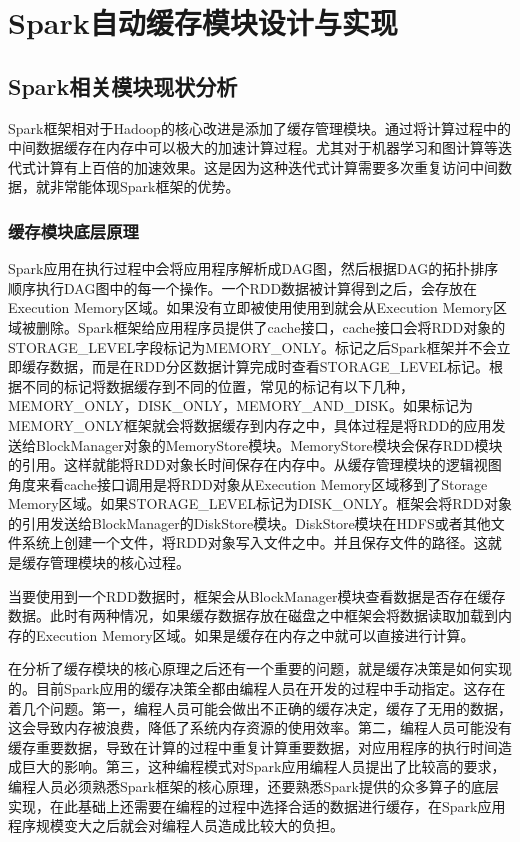 \chapter{Spark自动缓存模块设计与实现}\label{chap:auto-cache}

\section{Spark相关模块现状分析}
Spark框架相对于Hadoop的核心改进是添加了缓存管理模块。通过将计算过程中的中间数据缓存在内存中可以极大的加速计算过程。尤其对于机器学习和图计算等迭代式计算有上百倍的加速效果。这是因为这种迭代式计算需要多次重复访问中间数据，就非常能体现Spark框架的优势。

\subsection{缓存模块底层原理}
Spark应用在执行过程中会将应用程序解析成DAG图，然后根据DAG的拓扑排序顺序执行DAG图中的每一个操作。一个RDD数据被计算得到之后，会存放在Execution Memory区域。如果没有立即被使用使用到就会从Execution Memory区域被删除。Spark框架给应用程序员提供了cache接口，cache接口会将RDD对象的STORAGE\_LEVEL字段标记为MEMORY\_ONLY。标记之后Spark框架并不会立即缓存数据，而是在RDD分区数据计算完成时查看STORAGE\_LEVEL标记。根据不同的标记将数据缓存到不同的位置，常见的标记有以下几种，MEMORY\_ONLY，DISK\_ONLY，MEMORY\_AND\_DISK。如果标记为MEMORY\_ONLY框架就会将数据缓存到内存之中，具体过程是将RDD的应用发送给BlockManager对象的MemoryStore模块。MemoryStore模块会保存RDD模块的引用。这样就能将RDD对象长时间保存在内存中。从缓存管理模块的逻辑视图角度来看cache接口调用是将RDD对象从Execution Memory区域移到了Storage Memory区域。如果STORAGE\_LEVEL标记为DISK\_ONLY。框架会将RDD对象的引用发送给BlockManager的DiskStore模块。DiskStore模块在HDFS或者其他文件系统上创建一个文件，将RDD对象写入文件之中。并且保存文件的路径。这就是缓存管理模块的核心过程。

当要使用到一个RDD数据时，框架会从BlockManager模块查看数据是否存在缓存数据。此时有两种情况，如果缓存数据存放在磁盘之中框架会将数据读取加载到内存的Execution Memory区域。如果是缓存在内存之中就可以直接进行计算。

在分析了缓存模块的核心原理之后还有一个重要的问题，就是缓存决策是如何实现的。目前Spark应用的缓存决策全都由编程人员在开发的过程中手动指定。这存在着几个问题。第一，编程人员可能会做出不正确的缓存决定，缓存了无用的数据，这会导致内存被浪费，降低了系统内存资源的使用效率。第二，编程人员可能没有缓存重要数据，导致在计算的过程中重复计算重要数据，对应用程序的执行时间造成巨大的影响。第三，这种编程模式对Spark应用编程人员提出了比较高的要求，编程人员必须熟悉Spark框架的核心原理，还要熟悉Spark提供的众多算子的底层实现，在此基础上还需要在编程的过程中选择合适的数据进行缓存，在Spark应用程序规模变大之后就会对编程人员造成比较大的负担。

